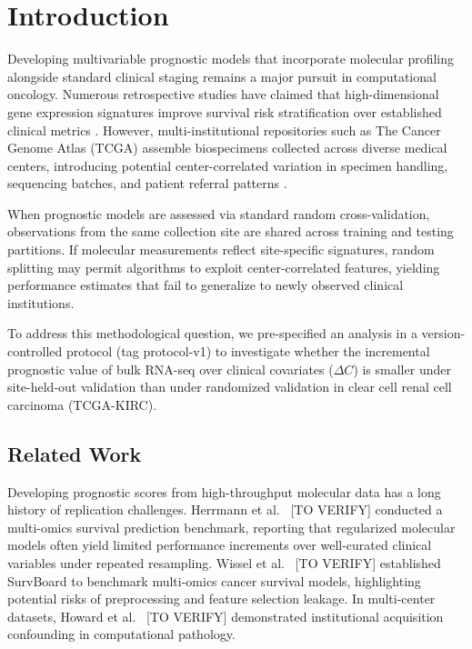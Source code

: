 \documentclass{article}
\begin{document}

\section{Introduction}
Developing multivariable prognostic models that incorporate molecular profiling alongside standard clinical staging remains a major pursuit in computational oncology. Numerous retrospective studies have claimed that high-dimensional gene expression signatures improve survival risk stratification over established clinical metrics \citep{herrmann2020benchmark, wissel2023survboard}. However, multi-institutional repositories such as The Cancer Genome Atlas (TCGA) assemble biospecimens collected across diverse medical centers, introducing potential center-correlated variation in specimen handling, sequencing batches, and patient referral patterns \citep{howard2021site}.

When prognostic models are assessed via standard random cross-validation, observations from the same collection site are shared across training and testing partitions. If molecular measurements reflect site-specific signatures, random splitting may permit algorithms to exploit center-correlated features, yielding performance estimates that fail to generalize to newly observed clinical institutions.

To address this methodological question, we pre-specified an analysis in a version-controlled protocol (tag protocol-v1) to investigate whether the incremental prognostic value of bulk RNA-seq over clinical covariates ($\Delta C$) is smaller under site-held-out validation than under randomized validation in clear cell renal cell carcinoma (TCGA-KIRC).

\subsection{Related Work}
Developing prognostic scores from high-throughput molecular data has a long history of replication challenges. Herrmann et al.~\citep{herrmann2020benchmark} [TO VERIFY] conducted a multi-omics survival prediction benchmark, reporting that regularized molecular models often yield limited performance increments over well-curated clinical variables under repeated resampling. Wissel et al.~\citep{wissel2023survboard} [TO VERIFY] established SurvBoard to benchmark multi-omics cancer survival models, highlighting potential risks of preprocessing and feature selection leakage. In multi-center datasets, Howard et al.~\citep{howard2021site} [TO VERIFY] demonstrated institutional acquisition confounding in computational pathology.
\end{document}
